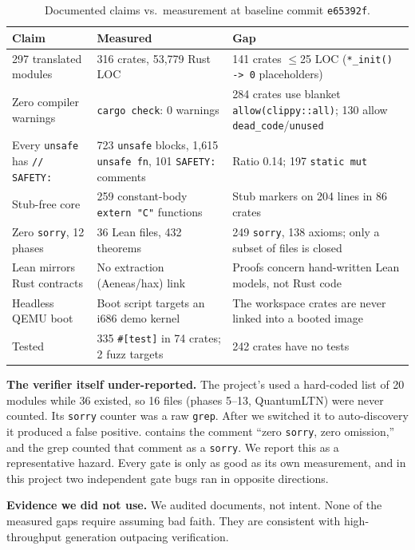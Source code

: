 \documentclass[sigconf,nonacm]{acmart}
\begin{document}
\begin{table}[t]
\caption{Documented claims vs.\ measurement at baseline commit \texttt{e65392f}.}
\label{tab:claims}
\small
\begin{tabular}{p{4.6cm}p{6.8cm}p{5.2cm}}
\toprule
\textbf{Claim} & \textbf{Measured} & \textbf{Gap} \\
\midrule
297 translated modules & 316 crates, 53{,}779 Rust LOC & 141 crates $\le$25 LOC (\texttt{*\_init() -> 0} placeholders) \\
Zero compiler warnings & \texttt{cargo check}: 0 warnings & 284 crates use blanket \texttt{allow(clippy::all)}; 130 allow \texttt{dead\_code}/\texttt{unused} \\
Every \texttt{unsafe} has \texttt{// SAFETY:} & 723 \texttt{unsafe} blocks, 1{,}615 \texttt{unsafe fn}, 101 \texttt{SAFETY:} comments & Ratio 0.14; 197 \texttt{static mut} \\
Stub-free core & 259 constant-body \texttt{extern "C"} functions & Stub markers on 204 lines in 86 crates \\
Zero \texttt{sorry}, 12 phases & 36 Lean files, 432 theorems & 249 \texttt{sorry}, 138 axioms; only a subset of files is closed \\
Lean mirrors Rust contracts & No extraction (Aeneas/hax) link & Proofs concern hand-written Lean models, not Rust code \\
Headless QEMU boot & Boot script targets an i686 demo kernel & The workspace crates are never linked into a booted image \\
Tested & 335 \texttt{\#[test]} in 74 crates; 2 fuzz targets & 242 crates have no tests \\
\bottomrule
\end{tabular}
\end{table}

\textbf{The verifier itself under-reported.} The project's  used a hard-coded list of 20 modules while 36 existed, so 16 files (phases 5--13, QuantumLTN) were never counted. Its \texttt{sorry} counter was a raw \texttt{grep}. After we switched it to auto-discovery it produced a false positive.  contains the comment ``zero \texttt{sorry}, zero omission,'' and the grep counted that comment as a \texttt{sorry}. We report this as a representative hazard. Every gate is only as good as its own measurement, and in this project two independent gate bugs ran in opposite directions.

\textbf{Evidence we did not use.} We audited documents, not intent. None of the measured gaps require assuming bad faith. They are consistent with high-throughput generation outpacing verification.
\end{document}
